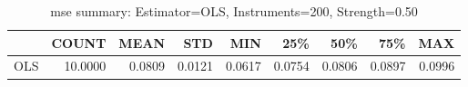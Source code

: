 \begin{table}[ht]
\centering
\caption{mse summary: Estimator=OLS, Instruments=200, Strength=0.50}
\begin{tabular}{lrrrrrrrr}
\toprule
 & COUNT & MEAN & STD & MIN & 25\% & 50\% & 75\% & MAX \\
\midrule
OLS & 10.0000 & 0.0809 & 0.0121 & 0.0617 & 0.0754 & 0.0806 & 0.0897 & 0.0996 \\
\bottomrule
\end{tabular}
\end{table}
